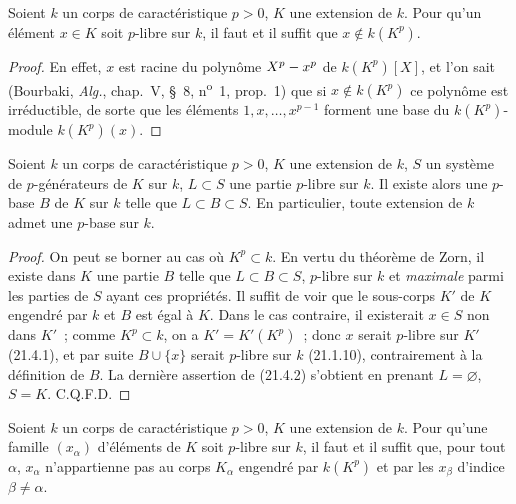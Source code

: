 \begin{lemma}[21.4.1]
\label{0.21.4.1-fr}
Soient $k$ un corps de caractéristique $p>0$, $K$ une extension de $k$.
Pour qu'un élément $x\in K$ soit $p$-libre sur $k$, il faut et il suffit que
$x\notin k(K^p)$.
\end{lemma}

\begin{proof}
En effet, $x$ est racine du polynôme $X^p- x^p$ de $k(K^p)[X]$, et l'on sait
(Bourbaki, \emph{Alg.}, chap.~V, §~8, n\textsuperscript{o}~1, prop.~1) que si
$x\notin k(K^p)$ ce polynôme est irréductible, de sorte que les éléments
$1,x,\ldots,x^{p-1}$ forment une base du $k(K^p)$-module $k(K^p)(x)$.
\end{proof}

\begin{theorem}[21.4.2]
\label{0.21.4.2-fr}
Soient $k$ un corps de caractéristique $p>0$, $K$ une extension de $k$,
$S$ un système de $p$-générateurs de $K$ sur $k$, $L\subset S$ une partie
$p$-libre sur $k$. Il existe alors une $p$-base $B$ de $K$ sur $k$ telle que
$L\subset B\subset S$. En particulier, toute extension de $k$ admet une
$p$-base sur $k$.
\end{theorem}

\begin{proof}
On peut se borner au cas où $K^p\subset k$. En vertu du théorème de Zorn,
il existe dans $K$ une partie $B$ telle que $L\subset B\subset S$, $p$-libre
sur $k$ et \emph{maximale} parmi les parties de $S$ ayant ces propriétés. Il suffit
de voir que le sous-corps $K'$ de $K$ engendré par $k$ et $B$ est égal à $K$.
Dans le cas contraire, il existerait $x\in S$ non dans $K'$~; comme
$K^p\subset k$, on a $K'=K'(K^p)$~; donc $x$ serait $p$-libre sur $K'$
(21.4.1), et par suite $B\cup\{x\}$ serait $p$-libre sur $k$ (21.1.10),
contrairement à la définition de $B$. La dernière assertion de (21.4.2)
s'obtient en prenant $L=\varnothing$, $S=K$. C.Q.F.D.
\end{proof}

\begin{corollary}[21.4.3]
\label{0.21.4.3-fr}
Soient $k$ un corps de caractéristique $p>0$, $K$ une extension de $k$.
Pour qu'une famille $(x_\alpha)$ d'éléments de $K$ soit $p$-libre sur $k$,
il faut et il suffit que, pour tout $\alpha$, $x_\alpha$ n'appartienne pas au
corps $K_\alpha$ engendré par $k(K^p)$ et par les $x_\beta$ d'indice
$\beta\neq\alpha$.
\end{corollary}

